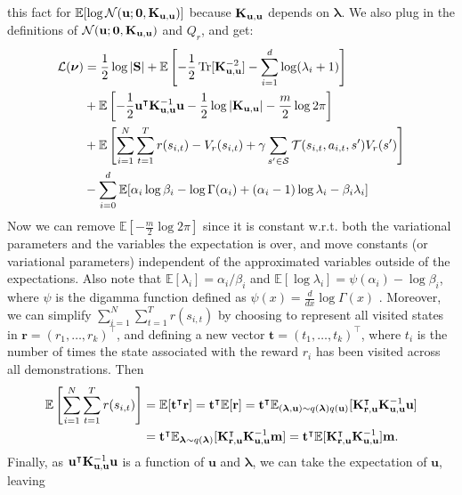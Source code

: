 \documentclass{mprop}
\theoremstyle{definition}
\DeclareMathOperator{\Tr}{Tr}
\begin{document}
this fact for $\mathbb{E}[\log \mathcal{N}(\mathbf{u}; \mathbf{0}, \mathbf{K}_{\mathbf{u},\mathbf{u}})]$
because $\mathbf{K}_{\mathbf{u},\mathbf{u}}$ depends on $\bm\lambda$. We also plug in the definitions of
$\mathcal{N}(\mathbf{u}; \mathbf{0}, \mathbf{K}_{\mathbf{u},\mathbf{u}})$ and $Q_r$, and get:
\begin{align*}
  \mathcal{L}(\bm\nu) &= \frac{1}{2}\log|\mathbf{S}| + \mathbb{E}\left[-\frac{1}{2}\Tr[\Kuu^{-2}] - \sum_{i=1}^d \log(\lambda_i + 1)\right] \\
  &+ \mathbb{E}\left[-\frac{1}{2}\mathbf{u}^\intercal\Kuu^{-1}\mathbf{u} -
    \frac{1}{2}\log|\Kuu| - \frac{m}{2}\log 2\pi\right] \\
  &+ \mathbb{E}\left[\sum_{i=1}^N \sum_{t=1}^T r(s_{i,t}) - V_r(s_{i,t}) + \gamma\sum_{s' \in \mathcal{S}}
    \mathcal{T}(s_{i,t}, a_{i,t}, s')V_r(s') \right] \\
  &- \sum_{i=0}^d \mathbb{E}[\alpha_i\log\beta_i - \log\Gamma(\alpha_i) + (\alpha_i - 1)\log\lambda_i - \beta_i\lambda_i]
\end{align*}
Now we can remove $\mathbb{E}\left[-\frac{m}{2}\log2\pi\right]$ since it is
constant w.r.t. both the variational parameters and the variables the
expectation is over, and move constants (or variational parameters) independent
of the approximated variables outside of the expectations. Also note that
$\mathbb{E}[\lambda_i] = \alpha_i/\beta_i$ and
$\mathbb{E}[\log \lambda_i] = \psi(\alpha_i) - \log\beta_i$, where $\psi$ is the
digamma function defined as $\psi(x) = \frac{d}{dx}\log\Gamma(x)$
\cite{DBLP:books/lib/Bishop07}. Moreover, we can simplify
$\sum_{i=1}^N\sum_{t=1}^Tr(s_{i,t})$ by choosing to represent all visited states
in $\mathbf{r} = (r_1, \dots, r_k)^\intercal$, and defining a new vector
$\mathbf{t} = (t_1, \dots, t_k)^\intercal$, where $t_i$ is the number of times
the state associated with the reward $r_i$ has been visited across all
demonstrations. Then
\begin{align*}
\mathbb{E} \left[ \sum_{i=1}^N\sum_{t=1}^Tr(s_{i,t}) \right] &=
    \mathbb{E}[\mathbf{t}^\intercal\mathbf{r}] =
    \mathbf{t}^\intercal\mathbb{E}[\mathbf{r}] =
    \mathbf{t}^\intercal\mathbb{E}_{(\bm\lambda, \mathbf{u}) \sim
  q(\bm\lambda)q(\mathbf{u})}[\mathbf{K}_{\mathbf{r},\mathbf{u}}^\intercal\mathbf{K}_{\mathbf{u},\mathbf{u}}^{-1}\mathbf{u}] \\
  &= \mathbf{t}^\intercal\mathbb{E}_{\bm\lambda \sim q(\bm\lambda)}[\mathbf{K}_{\mathbf{r},\mathbf{u}}^\intercal\mathbf{K}_{\mathbf{u},\mathbf{u}}^{-1}\mathbf{m}] = \mathbf{t}^\intercal\mathbb{E}[\mathbf{K}_{\mathbf{r},\mathbf{u}}^\intercal\mathbf{K}_{\mathbf{u},\mathbf{u}}^{-1}]\mathbf{m}.
\end{align*}
Finally, as $\mathbf{u}^\intercal\mathbf{K}_{\mathbf{u},\mathbf{u}}^{-1}\mathbf{u}$ is a function of
$\mathbf{u}$ and $\bm\lambda$, we can take the expectation of $\mathbf{u}$, leaving
\end{document}
